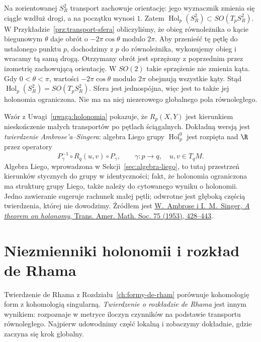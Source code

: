 \begin{przyklad}
\label{prz:holonomia-sfera}
Na zorientowanej $S_R^2$ transport zachowuje orientację:
jego wyznacznik zmienia się ciągle wzdłuż drogi,
a na początku wynosi $1$. Zatem
$\operatorname{Hol}_p(S_R^2)\subset SO(T_pS_R^2)$.
W Przykładzie~\ref{prz:transport-sfera} obliczyliśmy,
że obieg równoleżnika o kącie biegunowym $\theta$ daje obrót
o $-2\pi\cos\theta$ modulo $2\pi$. Aby przenieść tę
pętlę do ustalonego punktu $p$, dochodzimy z $p$ do
równoleżnika, wykonujemy obieg i wracamy tą samą drogą.
Otrzymany obrót jest sprzężony z poprzednim przez
izometrię zachowującą orientację. W $SO(2)$ takie
sprzężenie nie zmienia kąta. Gdy $0<\theta<\pi$,
wartości $-2\pi\cos\theta$ modulo $2\pi$ obejmują
wszystkie kąty. Stąd
$\operatorname{Hol}_p(S_R^2)=SO(T_pS_R^2)$.
Sfera jest jednospójna, więc jest to także jej
holonomia ograniczona. Nie ma na niej niezerowego
globalnego pola równoległego.
\end{przyklad}

\begin{uwaga}
\label{uwaga:ambrose-singer-holonomia}
Wzór z Uwagi~\ref{uwaga:holonomia} pokazuje, że
$R_p(X,Y)$ jest kierunkiem nieskończenie małych
transportów po pętlach ściągalnych. Dokładną wersją
jest \emph{twierdzenie Ambrose'a--Singera}:
algebra Liego grupy $\operatorname{Hol}^0_p$ jest
rozpięta nad $\R$ przez operatory
\[
 P_\gamma^{-1}\circ R_q(u,v)\circ P_\gamma,
 \qquad \gamma:p\longrightarrow q,\quad
 u,v\in T_qM.
\]
Algebra Liego, wprowadzona w Sekcji~\ref{sec:algebra-liego},
to tutaj przestrzeń kierunków stycznych do grupy
w identyczności; fakt, że holonomia ograniczona ma
strukturę grupy Liego, także należy do cytowanego
wyniku o holonomii. Jedno zawieranie sugeruje rachunek małej
pętli; odwrotne jest głęboką częścią twierdzenia, której
nie dowodzimy. Źródłem jest
\href{https://doi.org/10.1090/S0002-9947-1953-0063739-1}
{W.~Ambrose i I.~M.~Singer, \emph{A theorem on holonomy},
Trans. Amer. Math. Soc. 75 (1953), 428--443}.
\end{uwaga}

\section{Niezmienniki holonomii i rozkład de Rhama}
\label{sec:rozklad-de-rhama}

Twierdzenie de Rhama z Rozdziału~\ref{ch:formy-de-rham}
porównuje kohomologię form z kohomologią singularną.
\emph{Twierdzenie o rozkładzie de Rhama} jest innym
wynikiem: rozpoznaje w metryce iloczyn czynników na
podstawie transportu równoległego. Najpierw udowodnimy
część lokalną i zobaczymy dokładnie, gdzie zaczyna się
krok globalny.

